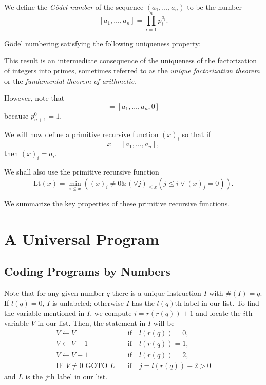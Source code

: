 \documentclass[12pt,a4paper,twoside,openany]{book}
\begin{document}
We define the \textit{G\"odel number} of the sequence $(a_1,\ldots,a_n)$ to be the number $$[a_1,\ldots,a_n]=\prod_{i=1}^np_i^{a_i}.$$

G\"odel numbering satisfying the following uniqueness property:

This result is an intermediate consequence of the uniqueness of the factorization of integers into primes, sometimes referred to as the \textit{unique factorization theorem} or the \textit{fundamental theorem of arithmetic}.

However, note that
\begin{equation}
    [a_1,\ldots,a_n]=[a_1,\ldots,a_n,0]
    \label{8.2}
\end{equation}
because $p_{n+1}^0=1$.

We will now define a primitive recursive function $(x)_i$ so that if $$x=[a_1,\ldots,a_n],$$ then $(x)_i=a_i$.

We shall also use the primitive recursive function $$\mathrm{Lt}(x)=\min_{i\leq x}((x)_i\neq0\&(\forall j)_{\leq x}(j\leq i\lor(x)_j=0)).$$

We summarize the key properties of these primitive recursive functions.


\chapter{A Universal Program}
\section{Coding Programs by Numbers}

Note that for any given number $q$ there is a unique instruction $I$ with $\#(I)=q$. If $l(q)=0$, $I$ is unlabeled; otherwise $I$ has the $l(q)$th label in our list. To find the variable mentioned in $I$, we compute $i=r(r(q))+1$ and locate the $i$th variable $V$ in our list. Then, the statement in $I$ will be
\begin{align*}
    V\leftarrow V&\quad\text{if}\quad l(r(q)) = 0,\\V\leftarrow V+1&\quad\text{if}\quad l(r(q))=1,\\V\leftarrow V-1&\quad\text{if}\quad l(r(q))=2,\\\text{IF }V\neq 0\text{ GOTO }L&\quad\text{if}\quad j=l(r(q))-2>0
\end{align*}
and $L$ is the $j$th label in our list.
\end{document}
